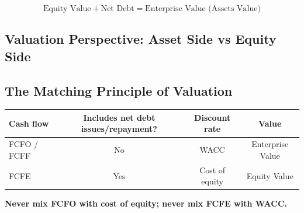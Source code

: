 \begin{keybox}
\[
\boxed{\text{Equity Value} + \text{Net Debt} = \text{Enterprise Value (Assets Value)}}
\]
\end{keybox}

\subsection[Valuation Perspective: Asset Side vs Equity Side]{Valuation Perspective: Asset Side vs Equity Side }

\begin{center}
\end{center}

\subsection{The Matching Principle of Valuation}

\begin{center}
\small
\begin{tabular}{@{}lccc@{}}
\toprule
\textbf{Cash flow} & \textbf{Includes net debt issues/repayment?} & \textbf{Discount rate} & \textbf{Value}\\
\midrule
FCFO / FCFF & No & WACC & Enterprise Value\\
FCFE & Yes & Cost of equity & Equity Value\\
\bottomrule
\end{tabular}
\end{center}

\begin{keybox}
\textbf{Never mix FCFO with cost of equity; never mix FCFE with WACC.}
\end{keybox}

